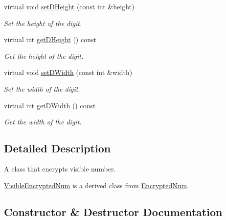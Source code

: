 \begin{DoxyCompactItemize}
virtual void \mbox{\hyperlink{class_visible_encrypted_num_a98161acb7fdfd6455286613a6d41cb4c}{set\+D\+Height}} (const int \&height)
\begin{DoxyCompactList}\small\item\em Set the height of the digit. \end{DoxyCompactList}\item 
virtual int \mbox{\hyperlink{class_visible_encrypted_num_a80d17697873e98c8b19599c2d13cc2f4}{get\+D\+Height}} () const
\begin{DoxyCompactList}\small\item\em Get the height of the digit. \end{DoxyCompactList}\item 
virtual void \mbox{\hyperlink{class_visible_encrypted_num_a914e70f40d7344355a343dc3db6cba1e}{set\+D\+Width}} (const int \&width)
\begin{DoxyCompactList}\small\item\em Set the width of the digit. \end{DoxyCompactList}\item 
virtual int \mbox{\hyperlink{class_visible_encrypted_num_a252dfa8c0add8c6fa244bdd835f7eed6}{get\+D\+Width}} () const
\begin{DoxyCompactList}\small\item\em Get the width of the digit. \end{DoxyCompactList}\end{DoxyCompactItemize}


\subsection{Detailed Description}
A class that encrypts visible number. 

\mbox{\hyperlink{class_visible_encrypted_num}{Visible\+Encrypted\+Num}} is a derived class from \mbox{\hyperlink{class_encrypted_num}{Encrypted\+Num}}. 

\subsection{Constructor \& Destructor Documentation}
\mbox{\label{class_visible_encrypted_num_abab6f8eac59edf419a06bfeda2ba2540}} 
